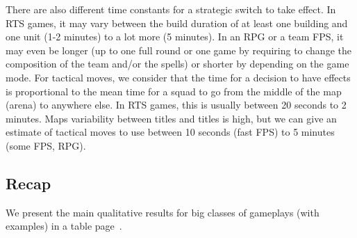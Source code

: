 There are also different time constants for a strategic switch to take effect. In RTS games, it may vary between the build duration of at least one building and one unit (1-2 minutes) to a lot more (5 minutes). In an RPG or a team FPS, it may even be longer (up to one full round or one game by requiring to change the composition of the team and/or the spells) or shorter by depending on the game mode. For tactical moves, we consider that the time for a decision to have effects is proportional to the mean time for a squad to go from the middle of the map (arena) to anywhere else. In RTS games, this is usually between 20 seconds to 2 minutes. Maps variability between  titles and  titles is high, but we can give an estimate of tactical moves to use between 10 seconds (fast FPS) to 5 minutes (some FPS, RPG).


\subsection{Recap}

We present the main qualitative results for big classes of gameplays (with examples) in a table page~\pageref{recapgames}.

